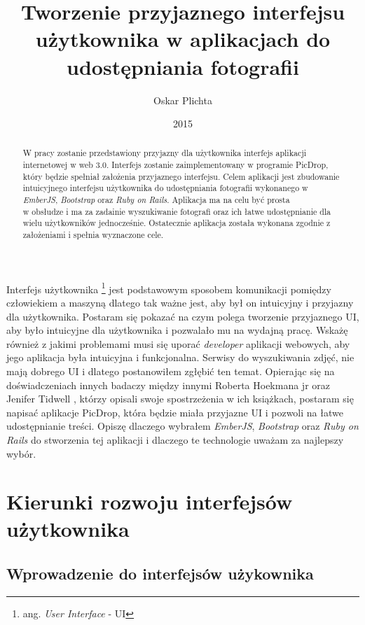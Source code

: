 \documentclass[brudnopis]{xmgr}
\author   {Oskar Plichta}
\title    {Tworzenie przyjaznego interfejsu użytkownika w aplikacjach do udostępniania fotografii }
\date     {2015}
\begin{document}
\begin{abstract}

W pracy zostanie przedstawiony przyjazny dla użytkownika interfejs aplikacji internetowej w web 3.0. Interfejs zostanie zaimplementowany w programie PicDrop,  który będzie spełniał założenia przyjaznego interfejsu. Celem aplikacji jest zbudowanie intuicyjnego interfejsu użytkownika do udostępniania fotografii wykonanego w \textit{EmberJS}, \textit{Bootstrap} oraz \textit{Ruby on Rails}. Aplikacja ma na celu być prosta \\ w obsłudze i ma za zadainie wyszukiwanie fotografi oraz ich łatwe udostępnianie dla wielu użytkowników jednocześnie. Ostatecznie aplikacja została wykonana zgodnie z założeniami i spełnia wyznaczone cele.

\end{abstract}

\maketitle
%
\introduction
Interfejs użytkownika \footnote{ang. \textit{User Interface} - UI}  jest podstawowym sposobem komunikacji pomiędzy człowiekiem a maszyną dlatego tak ważne jest, aby był on intuicyjny i przyjazny dla użytkownika. 
Postaram się pokazać na czym polega tworzenie przyjaznego UI, aby było intuicyjne dla użytkownika i pozwalało mu na wydajną pracę. Wskażę również z jakimi problemami musi się uporać \textit{developer} aplikacji webowych, aby jego aplikacja była intuicyjna i funkcjonalna. Serwisy do wyszukiwania zdjęć, nie mają dobrego UI i dlatego postanowiłem zgłębić ten temat. Opierając się na  doświadczeniach innych badaczy  między innymi Roberta Hoekmana jr  \cite {magiaUI} oraz Jenifer Tidwell  \cite {projektowanieUI}, którzy opisali swoje spostrzeżenia w ich książkach, postaram się napisać aplikacje PicDrop, która  będzie miała przyjazne UI i pozwoli na łatwe udostępnianie treści. Opiszę dlaczego wybrałem \textit{EmberJS}, \textit{Bootstrap} oraz \textit{Ruby on Rails} do stworzenia tej aplikacji i dlaczego te technologie uważam za najlepszy wybór.


\chapter{Kierunki rozwoju interfejsów użytkownika}

\section{Wprowadzenie do interfejsów użykownika}
\end{document}
